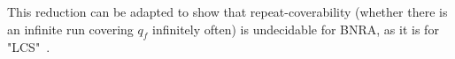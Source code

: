 
\begin{remark}
	This reduction can be adapted to show that repeat-coverability (whether there is an infinite run covering $q_f$ infinitely often) is undecidable for BNRA, as it is for "LCS"~\cite{AbdullaJ1996undec}. 
\end{remark}

